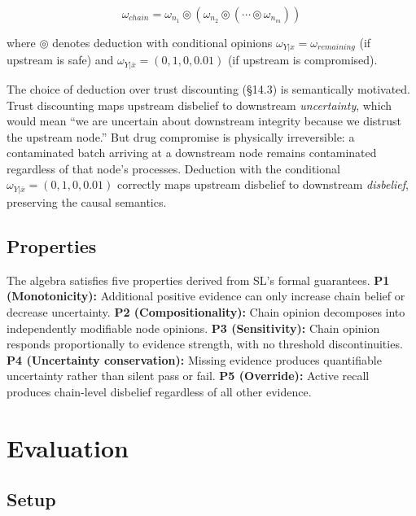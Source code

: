 \documentclass[conference]{IEEEtran}
\begin{document}
\begin{equation}
\omega_{chain} = \omega_{n_1} \circledcirc (\omega_{n_2} \circledcirc (\cdots \circledcirc \omega_{n_m}))
\label{eq:chain_propagation}
\end{equation}

\noindent where $\circledcirc$ denotes deduction with conditional
opinions $\omega_{Y|x} = \omega_{remaining}$ (if upstream is safe) and
$\omega_{Y|\overline{x}} = (0, 1, 0, 0.01)$ (if upstream is
compromised).

The choice of deduction over trust discounting (\S14.3) is semantically
motivated. Trust discounting maps upstream disbelief to downstream
\textit{uncertainty}, which would mean ``we are uncertain about
downstream integrity because we distrust the upstream node.'' But drug
compromise is physically irreversible: a contaminated batch arriving at
a downstream node remains contaminated regardless of that node's
processes. Deduction with the conditional
$\omega_{Y|\overline{x}} = (0, 1, 0, 0.01)$ correctly maps upstream
disbelief to downstream \textit{disbelief}, preserving the causal
semantics.

\subsection{Properties}

The algebra satisfies five properties derived from SL's formal
guarantees.
\textbf{P1 (Monotonicity):} Additional positive evidence can only
increase chain belief or decrease uncertainty.
\textbf{P2 (Compositionality):} Chain opinion decomposes into
independently modifiable node opinions.
\textbf{P3 (Sensitivity):} Chain opinion responds proportionally to
evidence strength, with no threshold discontinuities.
\textbf{P4 (Uncertainty conservation):} Missing evidence produces
quantifiable uncertainty rather than silent pass or fail.
\textbf{P5 (Override):} Active recall produces chain-level disbelief
regardless of all other evidence.

\section{Evaluation}

\subsection{Setup}
\end{document}
